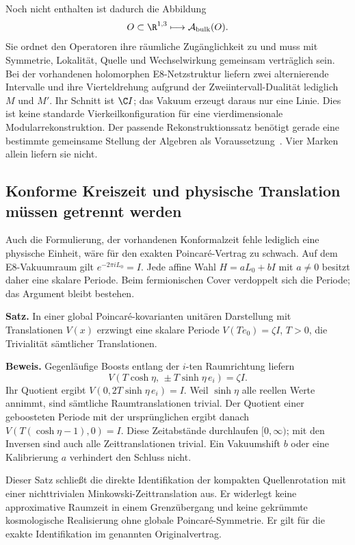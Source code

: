Noch nicht enthalten ist dadurch die Abbildung
\begin{equation}
O\subset\R^{1,3}\longmapsto\mathcal A_{\rm bulk}(O).
\end{equation}
Sie ordnet den Operatoren ihre räumliche Zugänglichkeit zu und muss mit Symmetrie, Lokalität, Quelle und Wechselwirkung gemeinsam verträglich sein. Bei der vorhandenen holomorphen E8-Netzstruktur liefern zwei alternierende Intervalle und ihre Vierteldrehung aufgrund der Zweiintervall-Dualität lediglich $M$ und $M'$. Ihr Schnitt ist $\C I$; das Vakuum erzeugt daraus nur eine Linie. Dies ist keine standarde Vierkeilkonfiguration für eine vierdimensionale Modularrekonstruktion. Der passende Rekonstruktionssatz benötigt gerade eine bestimmte gemeinsame Stellung der Algebren als Voraussetzung~\cite{kahlerwiesbrock}. Vier Marken allein liefern sie nicht.

\subsection{Konforme Kreiszeit und physische Translation müssen getrennt werden}\label{sec:physicaltimeaudit}
Auch die Formulierung, der vorhandenen Konformalzeit fehle lediglich eine physische Einheit, wäre für den exakten Poincar\'e-Vertrag zu schwach. Auf dem E8-Vakuumraum gilt $e^{-2\pi iL_0}=I$. Jede affine Wahl $H=aL_0+bI$ mit $a\ne0$ besitzt daher eine skalare Periode. Beim fermionischen Cover verdoppelt sich die Periode; das Argument bleibt bestehen.

\textbf{Satz.} In einer global Poincar\'e-kovarianten unitären Darstellung mit Translationen $V(x)$ erzwingt eine skalare Periode $V(Te_0)=\zeta I$, $T>0$, die Trivialität sämtlicher Translationen.

\textbf{Beweis.} Gegenläufige Boosts entlang der $i$-ten Raumrichtung liefern
\begin{equation}
V(T\cosh\eta,\,\pm T\sinh\eta\,e_i)=\zeta I.
\end{equation}
Ihr Quotient ergibt $V(0,2T\sinh\eta\,e_i)=I$. Weil $\sinh\eta$ alle reellen Werte annimmt, sind sämtliche Raumtranslationen trivial. Der Quotient einer geboosteten Periode mit der ursprünglichen ergibt danach $V(T(\cosh\eta-1),0)=I$. Diese Zeitabstände durchlaufen $[0,\infty)$; mit den Inversen sind auch alle Zeittranslationen trivial. Ein Vakuumshift $b$ oder eine Kalibrierung $a$ verhindert den Schluss nicht.

Dieser Satz schließt die direkte Identifikation der kompakten Quellenrotation mit einer nichttrivialen Minkowski-Zeittranslation aus. Er widerlegt keine approximative Raumzeit in einem Grenzübergang und keine gekrümmte kosmologische Realisierung ohne globale Poincar\'e-Symmetrie. Er gilt für die exakte Identifikation im genannten Originalvertrag.

